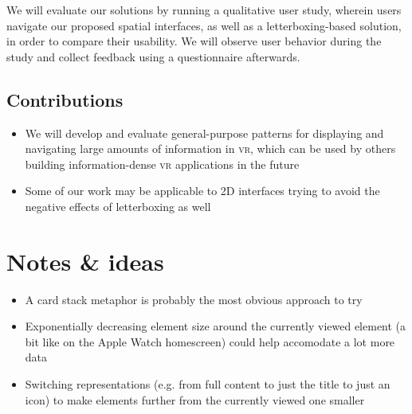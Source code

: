 We will evaluate our solutions by running a qualitative user study, wherein users navigate our proposed spatial interfaces, as well as a letterboxing-based solution, in order to compare their usability. We will observe user behavior during the study and collect feedback using a questionnaire afterwards.

\subsection{Contributions}
\begin{itemize}
  \setlength\itemsep{.1em}
  \item We will develop and evaluate general-purpose patterns for displaying and navigating large amounts of information in \textsc{vr}, which can be used by others building information-dense \textsc{vr} applications in the future
	\item Some of our work may be applicable to 2D interfaces trying to avoid the negative effects of letterboxing as well
\end{itemize}


\section{Notes \& ideas}
\begin{itemize}
  \setlength\itemsep{.1em}
	\item A card stack metaphor is probably the most obvious approach to try
	\item Exponentially decreasing element size around the currently viewed element (a bit like on the Apple Watch homescreen) could help accomodate a lot more data
	\item Switching representations (e.g. from full content to just the title to just an icon) to make elements further from the currently viewed one smaller
\end{itemize}





